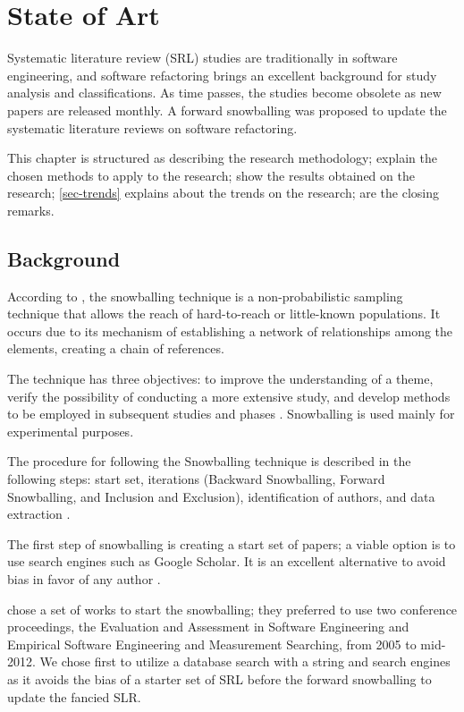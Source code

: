 \chapter{State of Art}%
\label{chap-state}

Systematic literature review (SRL) studies are traditionally in software engineering, and software refactoring brings an excellent background for study analysis and classifications. As time passes, the studies become obsolete as new papers are released monthly. A forward snowballing was proposed to update the systematic literature reviews on software refactoring.

This chapter is structured as  describing the research methodology;  explain the chosen methods to apply to the research;  show the results obtained on the research; \cref{sec-trends} explains about the trends on the research;  are the closing remarks.

\section{Background}
\label{sec-background}
According to \cite{bernard2006}, the snowballing technique is a non-probabilistic sampling technique that allows the reach of hard-to-reach or little-known populations. It occurs due to its mechanism of establishing a network of relationships among the elements, creating a chain of references.

The technique has three objectives: to improve the understanding of a theme, verify the possibility of conducting a more extensive study, and develop methods to be employed in subsequent studies and phases \cite{vinuto2014}. Snowballing is used mainly for experimental purposes.

The procedure for following the Snowballing technique is described in the following steps: start set, iterations (Backward Snowballing, Forward Snowballing, and Inclusion and Exclusion), identification of authors, and data extraction \cite{Wohlin2014}.

The first step of snowballing is creating a start set of papers; a viable option is to use search engines such as Google Scholar. It is an excellent alternative to avoid bias in favor of any author \cite{Wohlin2014}.

\textcite{Kitchenham2013} chose a set of works to start the snowballing; they preferred to use two conference proceedings, the Evaluation and Assessment in Software Engineering and Empirical Software Engineering and Measurement Searching, from 2005 to mid-2012. We chose first to utilize a database search with a string and search engines as it avoids the bias of a starter set of SRL before the forward snowballing to update the fancied SLR.

